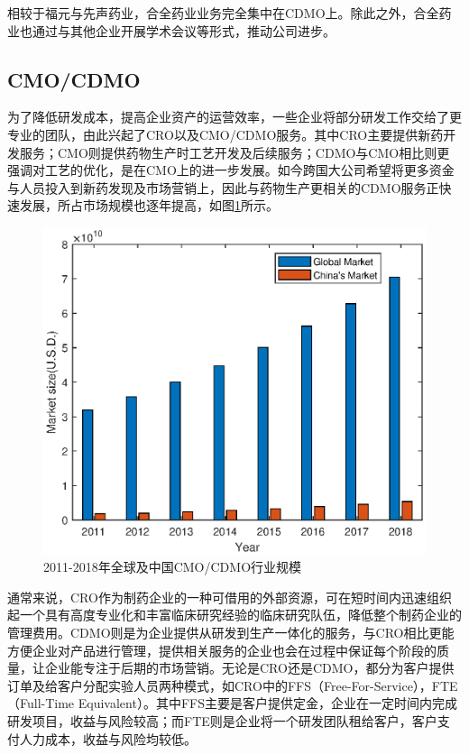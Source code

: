 \documentclass[twocolumn,openany]{ctexbook}
\begin{document}
			相较于福元与先声药业，合全药业业务完全集中在CDMO上。除此之外，合全药业也通过与其他企业开展学术会议等形式，推动公司进步。
			
			
			
			\subsection{CMO/CDMO}
			为了降低研发成本，提高企业资产的运营效率，一些企业将部分研发工作交给了更专业的团队，由此兴起了CRO以及CMO/CDMO服务。其中CRO主要提供新药开发服务；CMO则提供药物生产时工艺开发及后续服务；CDMO与CMO相比则更强调对工艺的优化，是在CMO上的进一步发展。如今跨国大公司希望将更多资金与人员投入到新药发现及市场营销上，因此与药物生产更相关的CDMO服务正快速发展，所占市场规模也逐年提高，如图\ref{fig:fig4}所示\citep{RN25}。
			
			\begin{figure}
				\centering
				\includegraphics[width=1.0\linewidth]{fig4}
				\caption{2011-2018年全球及中国CMO/CDMO行业规模}
				\label{fig:fig4}
			\end{figure}
			
			通常来说，CRO作为制药企业的一种可借用的外部资源，可在短时间内迅速组织起一个具有高度专业化和丰富临床研究经验的临床研究队伍，降低整个制药企业的管理费用\citep{RN10}。CDMO则是为企业提供从研发到生产一体化的服务，与CRO相比更能方便企业对产品进行管理，提供相关服务的企业也会在过程中保证每个阶段的质量，让企业能专注于后期的市场营销。无论是CRO还是CDMO，都分为客户提供订单及给客户分配实验人员两种模式，如CRO中的FFS（Free-For-Service），FTE（Full-Time Equivalent）。其中FFS主要是客户提供定金，企业在一定时间内完成研发项目，收益与风险较高；而FTE则是企业将一个研发团队租给客户，客户支付人力成本，收益与风险均较低。
			
\end{document}
